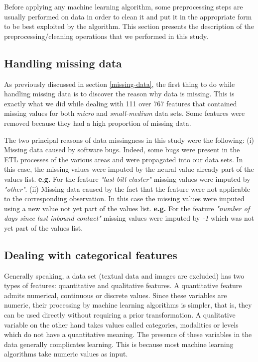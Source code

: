 \documentclass[LaM,binding=0.6cm, english]{sapthesis}
\begin{document}
Before applying any machine learning algorithm, some preprocessing steps are usually performed on data in order to clean it and put it in the appropriate form to be best exploited by the algorithm. This section presents the description of the preprocessing/cleaning operations that we performed in this study.

\subsection{Handling missing data}

As previously discussed in section \ref{missing-data}, the first thing to do while handling missing data is to discover the reason why data is missing. This is exactly what we did while dealing with 111 over 767 features that contained missing values for both \textit{micro} and \textit{small-medium} data sets. Some features were removed because they had a high proportion of missing data.

The two principal reasons of data missingness in this study were the following: (i) Missing data caused by software bugs. Indeed, some bugs were present in the ETL processes of the various areas and were propagated into our data sets. In this case, the missing values were imputed by the neural value already part of the values list. \textbf{e.g.} For the feature \textit{"last bill cluster"} missing values were imputed by \textit{"other"}. (ii) Missing data caused by the fact that the feature were not applicable to the corresponding observation. In this case the missing values were imputed using a new value not yet part of the values list. \textbf{e.g.} For the feature \textit{"number of days since last inbound contact"} missing values were imputed by \textit{-1} which was not yet part of the values list.

\subsection{Dealing with categorical features}

Generally speaking, a data set (textual data and images are excluded) has two types of features: quantitative and qualitative features. A quantitative feature admits numerical, continuous or discrete values. Since these variables are numeric, their processing by machine learning algorithms is simpler, that is, they can be used directly without requiring a prior transformation. A qualitative variable on the other hand takes values called categories, modalities or levels which do not have a quantitative meaning. The presence of these variables in the data generally complicates learning. This is because most machine learning algorithms take numeric values as input.
\end{document}
